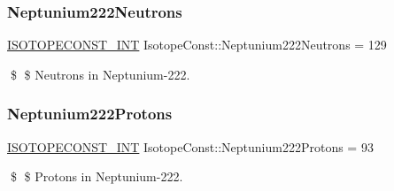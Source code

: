 \subsubsection{\texorpdfstring{Neptunium222\+Neutrons}{Neptunium222Neutrons}}
{\footnotesize\ttfamily \mbox{\hyperlink{group___isotope_const-_macros_ga5f18360b3e99483a35c32d789e62621c}{I\+S\+O\+T\+O\+P\+E\+C\+O\+N\+S\+T\+\_\+\+I\+NT}} Isotope\+Const\+::\+Neptunium222\+Neutrons = 129}

\$ \$ Neutrons in Neptunium-\/222. \mbox{\label{group___isotope_const-_neptunium-_np222_ga0136ffd2799307b7143ac70f4f63fcd9}} 
\subsubsection{\texorpdfstring{Neptunium222\+Protons}{Neptunium222Protons}}
{\footnotesize\ttfamily \mbox{\hyperlink{group___isotope_const-_macros_ga5f18360b3e99483a35c32d789e62621c}{I\+S\+O\+T\+O\+P\+E\+C\+O\+N\+S\+T\+\_\+\+I\+NT}} Isotope\+Const\+::\+Neptunium222\+Protons = 93}

\$ \$ Protons in Neptunium-\/222. 
